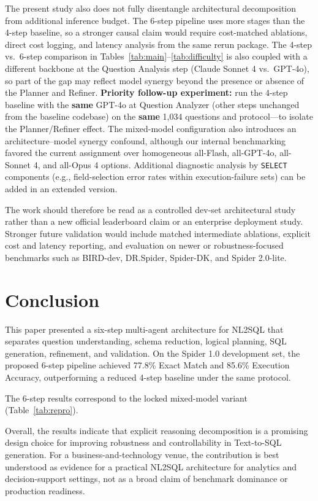 The present study also does not fully disentangle architectural decomposition from additional inference budget. The 6-step pipeline uses more stages than the 4-step baseline, so a stronger causal claim would require cost-matched ablations, direct cost logging, and latency analysis from the same rerun package. The 4-step vs.\ 6-step comparison in Tables~\ref{tab:main}--\ref{tab:difficulty} is also coupled with a different backbone at the Question Analysis step (Claude Sonnet 4 vs.\ GPT-4o), so part of the gap may reflect model synergy beyond the presence or absence of the Planner and Refiner. \textbf{Priority follow-up experiment:} run the 4-step baseline with the \textbf{same} GPT-4o at Question Analyzer (other steps unchanged from the baseline codebase) on the \textbf{same} 1,034 questions and protocol---to isolate the Planner/Refiner effect. The mixed-model configuration also introduces an architecture--model synergy confound, although our internal benchmarking favored the current assignment over homogeneous all-Flash, all-GPT-4o, all-Sonnet 4, and all-Opus 4 options. Additional diagnostic analysis by \texttt{SELECT} components (e.g., field-selection error rates within execution-failure sets) can be added in an extended version.

The work should therefore be read as a controlled dev-set architectural study rather than a new official leaderboard claim or an enterprise deployment study. Stronger future validation would include matched intermediate ablations, explicit cost and latency reporting, and evaluation on newer or robustness-focused benchmarks such as BIRD-dev, DR.Spider, Spider-DK, and Spider 2.0-lite.

\section{Conclusion}\label{sec:conclusion}

This paper presented a six-step multi-agent architecture for NL2SQL that separates question understanding, schema reduction, logical planning, SQL generation, refinement, and validation. On the Spider 1.0 development set, the proposed 6-step pipeline achieved 77.8\% Exact Match and 85.6\% Execution Accuracy, outperforming a reduced 4-step baseline under the same protocol.

The 6-step results correspond to the locked mixed-model variant (Table~\ref{tab:repro}).

Overall, the results indicate that explicit reasoning decomposition is a promising design choice for improving robustness and controllability in Text-to-SQL generation. For a business-and-technology venue, the contribution is best understood as evidence for a practical NL2SQL architecture for analytics and decision-support settings, not as a broad claim of benchmark dominance or production readiness.
